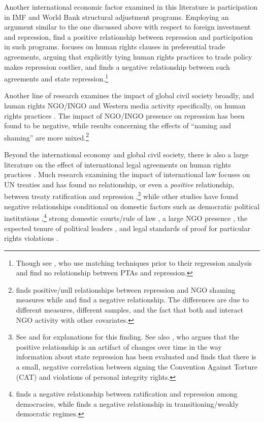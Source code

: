 \documentclass[11pt]{article}
\begin{document}
Another international economic factor examined in this literature is participation in IMF and World Bank structural adjustment programs. Employing an argument similar to the one discussed above with respect to foreign investment and repression, \citet{AbouharbCingranelli2006, AbouharbCingranelli2007} find a positive relationship between repression and participation in such programs. \citet{HafnerBurton2005io} focuses on human rights clauses in preferential trade agreements, arguing that explicitly tying human rights practices to trade policy makes repression costlier, and finds a negative relationship between such agreements and state repression.\footnote{Though see \citet{SpilkerBohmelt2012}, who use matching techniques prior to their regression analysis and find no relationship between PTAs and repression.} 

Another line of research examines the impact of global civil society broadly, and human rights NGO/INGO and Western media activity specifically, on human rights practices \citep{HafnerBurtonTsutsui2005,Franklin2008,HafnerBurton2008,MurdieDavis2012}. The impact of NGO/INGO presence on repression has been found to be negative, while results concerning the effects of ``naming and shaming'' are more mixed.\footnote{\citet{HafnerBurton2008} finds positive/null relationships between repression and NGO shaming measures while \citet{Franklin2008} and \citet{MurdieDavis2012} find a negative relationship. The differences are due to different measures, different samples, and the fact that both \citet{Franklin2008} and \citet{MurdieDavis2012} interact NGO activity with other covariates.} 

Beyond the international economy and global civil society, there is also a large literature on the effect of international legal agreements on human rights practices \citep{Keith1999,Hathaway2002,Neumayer2005,Simmons2009,PowellStaton2009,Hill2010,ConradRitter2013,Lupu2013,Fariss2013}. Much research examining the impact of international law focuses on UN treaties and has found no relationship, or even a {\em positive} relationship, between treaty ratification and repression \citep{Keith1999,Hathaway2002,Hill2010},\footnote{See \citet{Vreeland2008} and \citet{HollyerRosendorff2011} for explanations for this finding. See also \citet{Fariss2013}, who argues that the positive relationship is an artifact of changes over time in the way information about state repression has been evaluated and finds that there is a small, negative correlation between signing the Convention Against Torture (CAT) and violations of personal integrity rights.} while other studies have found negative relationships conditional on domestic factors such as democratic political institutions \citep{Neumayer2005,Simmons2009},\footnote{\citet{Neumayer2005} finds a negative relationship between ratification and repression among democracies, while \citet{Simmons2009} finds a negative relationship in transitioning/weakly democratic regimes.} strong domestic courts/rule of law \citep{Simmons2009}, a large NGO presence \citep{Neumayer2005}, the expected tenure of political leaders \citep{ConradRitter2013}, and legal standards of proof for particular rights violations \citep{Lupu2013}. 
\end{document}
